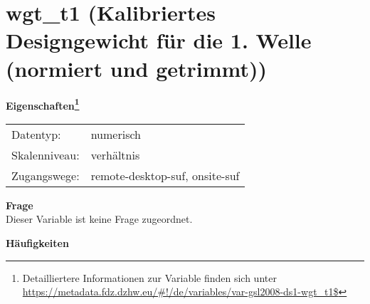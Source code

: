
    \setcounter{footnote}{0}

    \vspace*{-1.8cm}
	\section{wgt\_t1 (Kalibriertes Designgewicht für die 1. Welle  (normiert und getrimmt))}
	\label{section:wgt_t1}



    \vspace*{0.5cm}
    \noindent\textbf{Eigenschaften\footnote{Detailliertere Informationen zur Variable finden sich unter
		\url{https://metadata.fdz.dzhw.eu/\#!/de/variables/var-gsl2008-ds1-wgt_t1$}}}\\
	\begin{tabularx}{\hsize}{@{}lX}
	Datentyp: & numerisch \\
	Skalenniveau: & verhältnis \\
	Zugangswege: &
	  remote-desktop-suf, 
	  onsite-suf
 \\
    \end{tabularx}



		\vspace*{0.5cm}
		\noindent\textbf{Frage}\\
		Dieser Variable ist keine Frage zugeordnet.





        		\vspace*{0.5cm}
                \noindent\textbf{Häufigkeiten}

